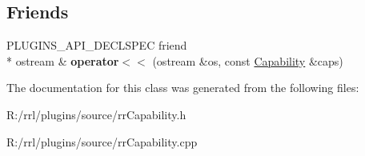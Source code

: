 \subsection*{Friends}
\begin{DoxyCompactItemize}
\item 
\hypertarget{classrrp_1_1_capability_a7bbffd182a16d626d8fefdc09be91fc3}{P\-L\-U\-G\-I\-N\-S\-\_\-\-A\-P\-I\-\_\-\-D\-E\-C\-L\-S\-P\-E\-C friend \\*
ostream \& {\bfseries operator$<$$<$} (ostream \&os, const \hyperlink{classrrp_1_1_capability}{Capability} \&caps)}\label{classrrp_1_1_capability_a7bbffd182a16d626d8fefdc09be91fc3}

\end{DoxyCompactItemize}


The documentation for this class was generated from the following files\-:\begin{DoxyCompactItemize}
\item 
R\-:/rrl/plugins/source/rr\-Capability.\-h\item 
R\-:/rrl/plugins/source/rr\-Capability.\-cpp\end{DoxyCompactItemize}
